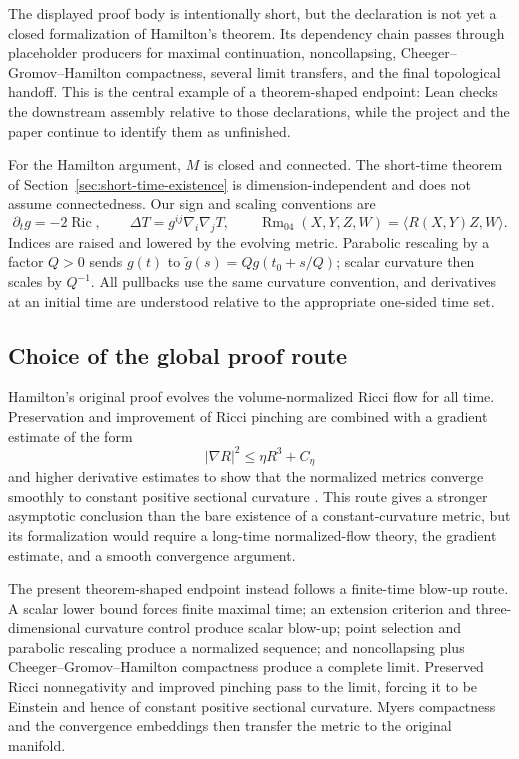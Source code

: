 \documentclass[11pt]{article}
\theoremstyle{plain}
\theoremstyle{definition}
\theoremstyle{remark}
\newcommand{\Ric}{\operatorname{Ric}}
\newcommand{\Rm}{\operatorname{Rm}}
\begin{document}
The displayed proof body is intentionally short, but the declaration is not
yet a closed formalization of Hamilton's theorem.  Its dependency chain passes
through placeholder producers for maximal continuation, noncollapsing,
Cheeger--Gromov--Hamilton compactness, several limit transfers, and the final
topological handoff.  This is the central example of a theorem-shaped endpoint:
Lean checks the downstream assembly relative to those declarations, while the
project and the paper continue to identify them as unfinished.

For the Hamilton argument, $M$ is closed and connected.  The short-time theorem
of Section~\ref{sec:short-time-existence} is dimension-independent and does not
assume connectedness.  Our sign and scaling conventions are
\[
  \partial_tg=-2\Ric,
  \qquad
  \Delta T=g^{ij}\nabla_i\nabla_jT,
  \qquad
  \Rm_{04}(X,Y,Z,W)=\langle R(X,Y)Z,W\rangle.
\]
Indices are raised and lowered by the evolving metric.  Parabolic rescaling by
a factor $Q>0$ sends $g(t)$ to
$\widetilde g(s)=Q g(t_0+s/Q)$; scalar curvature then scales by $Q^{-1}$.
All pullbacks use the same curvature convention, and derivatives at an initial
time are understood relative to the appropriate one-sided time set.

\subsection{Choice of the global proof route}
\label{sec:proof-variants}

Hamilton's original proof evolves the volume-normalized Ricci flow for all
time.  Preservation and improvement of Ricci pinching are combined with a
gradient estimate of the form
\[
  |\nabla R|^2\le \eta R^3+C_\eta
\]
and higher derivative estimates to show that the normalized metrics converge
smoothly to constant positive sectional curvature
\cite{MR664497}.  This route gives a stronger asymptotic conclusion than the
bare existence of a constant-curvature metric, but its formalization would
require a long-time normalized-flow theory, the gradient estimate, and a
smooth convergence argument.

The present theorem-shaped endpoint instead follows a finite-time blow-up
route.  A scalar lower bound forces finite maximal time; an extension criterion
and three-dimensional curvature control produce scalar blow-up; point
selection and parabolic rescaling produce a normalized sequence; and
noncollapsing plus Cheeger--Gromov--Hamilton compactness produce a complete
limit.  Preserved Ricci nonnegativity and improved pinching pass to the limit,
forcing it to be Einstein and hence of constant positive sectional curvature.
Myers compactness and the convergence embeddings then transfer the metric to
the original manifold.
\end{document}

